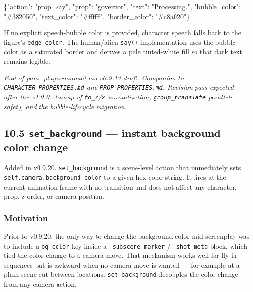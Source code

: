 \documentclass[
  11pt,
]{book}
\newenvironment{Shaded}{}{}
\newcommand{\DataTypeTok}[1]{\textcolor[rgb]{0.56,0.13,0.00}{#1}}
\newcommand{\FunctionTok}[1]{\textcolor[rgb]{0.02,0.16,0.49}{#1}}
\newcommand{\StringTok}[1]{\textcolor[rgb]{0.25,0.44,0.63}{#1}}
\begin{document}
\begin{Shaded}
\begin{Highlighting}[]
\FunctionTok{\{}\DataTypeTok{"action"}\FunctionTok{:} \StringTok{"prop\_say"}\FunctionTok{,} \DataTypeTok{"prop"}\FunctionTok{:} \StringTok{"governor"}\FunctionTok{,}
 \DataTypeTok{"text"}\FunctionTok{:} \StringTok{"Processing."}\FunctionTok{,}
 \DataTypeTok{"bubble\_color"}\FunctionTok{:} \StringTok{"\#382050"}\FunctionTok{,}
 \DataTypeTok{"text\_color"}\FunctionTok{:} \StringTok{"\#ffffff"}\FunctionTok{,}
 \DataTypeTok{"border\_color"}\FunctionTok{:} \StringTok{"\#c8a020"}\FunctionTok{\}}
\end{Highlighting}
\end{Shaded}

If no explicit speech-bubble color is provided, character speech falls
back to the figure's \texttt{edge\_color}. The human/alien
\texttt{say()} implementation uses the bubble color as a saturated
border and derives a pale tinted-white fill so that dark text remains
legible.


\emph{End of pam\_player-manual.md v0.9.13 draft. Companion to
\texttt{CHARACTER\_PROPERTIES.md} and \texttt{PROP\_PROPERTIES.md}.
Revision pass expected after the v1.0.0 cleanup of
\texttt{to\_x}/\texttt{x} normalization, \texttt{group\_translate}
parallel-safety, and the bubble-lifecycle migration.}

\subsection{\texorpdfstring{10.5 \texttt{set\_background} --- instant
background color
change}{10.5 set\_background --- instant background color change}}\label{set-background}

Added in v0.9.20. \texttt{set\_background} is a scene-level action that
immediately sets \texttt{self.camera.background\_color} to a given hex
color string. It fires at the current animation frame with no transition
and does not affect any character, prop, z-order, or camera position.

\subsubsection{Motivation}\label{set-background-motivation}

Prior to v0.9.20, the only way to change the background color
mid-screenplay was to include a \texttt{bg\_color} key inside a
\texttt{\_subscene\_marker} / \texttt{\_shot\_meta} block, which tied
the color change to a camera move. That mechanism works well for
fly-in sequences but is awkward when no camera move is wanted --- for
example at a plain scene cut between locations. \texttt{set\_background}
decouples the color change from any camera action.
\end{document}
